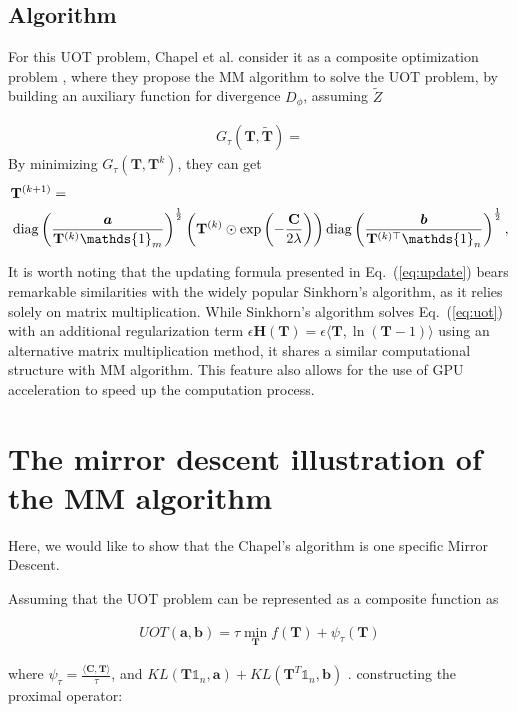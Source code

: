 \documentclass[conference]{IEEEtran}
\newcommand{\one}{\mathds{1}}
\newcommand{\mat}[1]{\mathbf{#1}}
\renewcommand{\vec}[1]{\bm{#1}}
\begin{document}
\subsection{Algorithm}
For this UOT problem, Chapel et al. consider it as a composite optimization problem \cite{Chapel_NeurIPS_2021}, where they propose the MM algorithm to solve the UOT problem, by building an auxiliary function for divergence $D_{\phi}$, assuming $\tilde{Z}$

\begin{align}
\label{eq:af}
G_{\tau}(\mat T, \tilde{\mat T}) = 
\end{align}
By minimizing $G_{\tau}(\mat T, \mat T^{k}) $, they can get
\begin{align}
\label{eq:update}
&\mat{T}^{(k+1)}=\notag\\
&\operatorname{diag}\left(\frac{\vec a}{\mat{T}^{(k)} \one_m}\right)^{\frac{1}{2}}\left(\mat{T}^{(k)} \odot \exp \left(-\frac{\mat C}{2 \lambda}\right)\right)
\operatorname{diag}\left(\frac{\vec{b}}{\mat{T}^{(k) \top} \one_n}\right)^{\frac{1}{2}},\notag\\
\end{align}

It is worth noting that the updating formula presented in Eq.~(\ref{eq:update}) bears remarkable similarities with the widely popular Sinkhorn's algorithm, as it relies solely on matrix multiplication. While Sinkhorn's algorithm solves Eq.~(\ref{eq:uot}) with an additional regularization term $\epsilon \mat H(\mat T) = \epsilon \langle \mat T,\ln(\mat T - 1)\rangle$ using an alternative matrix multiplication method, it shares a similar computational structure with MM algorithm. This feature also allows for the use of GPU acceleration to speed up the computation process.


\section{The mirror descent illustration of the MM algorithm}
Here, we would like to show that the Chapel's algorithm is one specific Mirror Descent.

Assuming that the UOT problem can be represented as a composite function as

\begin{align}
\label{eq:comf}
UOT(\vec a, \vec b) = \tau \min_{\mat T}  f(\mat T)+ \psi_{\tau}(\mat T)
\end{align}

where $\psi_{\tau} = \frac{\langle \mat C, \mat T \rangle}{\tau}$, and $KL(\mat{T} \one_n,\vec{a}) + KL(\mat{T}^{T} \one_n,\vec{b})$ . constructing the proximal operator:
 
\end{document}
